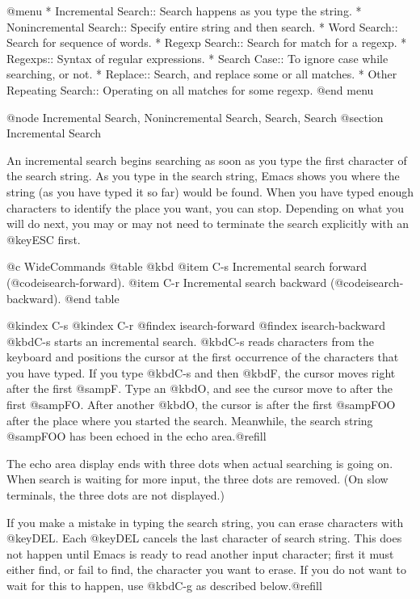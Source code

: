 {{{{{{{@menu
* Incremental Search::     Search happens as you type the string.
* Nonincremental Search::  Specify entire string and then search.
* Word Search::            Search for sequence of words.
* Regexp Search::          Search for match for a regexp.
* Regexps::                Syntax of regular expressions.
* Search Case::            To ignore case while searching, or not.
* Replace::                Search, and replace some or all matches.
* Other Repeating Search:: Operating on all matches for some regexp.
@end menu

@node Incremental Search, Nonincremental Search, Search, Search
@section Incremental Search

  An incremental search begins searching as soon as you type the first
character of the search string.  As you type in the search string, Emacs
shows you where the string (as you have typed it so far) would be found.
When you have typed enough characters to identify the place you want, you
can stop.  Depending on what you will do next, you may or may not need to
terminate the search explicitly with an @key{ESC} first.

@c WideCommands
@table @kbd
@item C-s
Incremental search forward (@code{isearch-forward}).
@item C-r
Incremental search backward (@code{isearch-backward}).
@end table

@kindex C-s
@kindex C-r
@findex isearch-forward
@findex isearch-backward
  @kbd{C-s} starts an incremental search.  @kbd{C-s} reads characters from
the keyboard and positions the cursor at the first occurrence of the
characters that you have typed.  If you type @kbd{C-s} and then @kbd{F},
the cursor moves right after the first @samp{F}.  Type an @kbd{O}, and see
the cursor move to after the first @samp{FO}.  After another @kbd{O}, the
cursor is after the first @samp{FOO} after the place where you started the
search.  Meanwhile, the search string @samp{FOO} has been echoed in the
echo area.@refill

  The echo area display ends with three dots when actual searching is going
on.  When search is waiting for more input, the three dots are removed.
(On slow terminals, the three dots are not displayed.)

  If you make a mistake in typing the search string, you can erase
characters with @key{DEL}.  Each @key{DEL} cancels the last character of
search string.  This does not happen until Emacs is ready to read another
input character; first it must either find, or fail to find, the character
you want to erase.  If you do not want to wait for this to happen, use
@kbd{C-g} as described below.@refill

}}}}}}}
